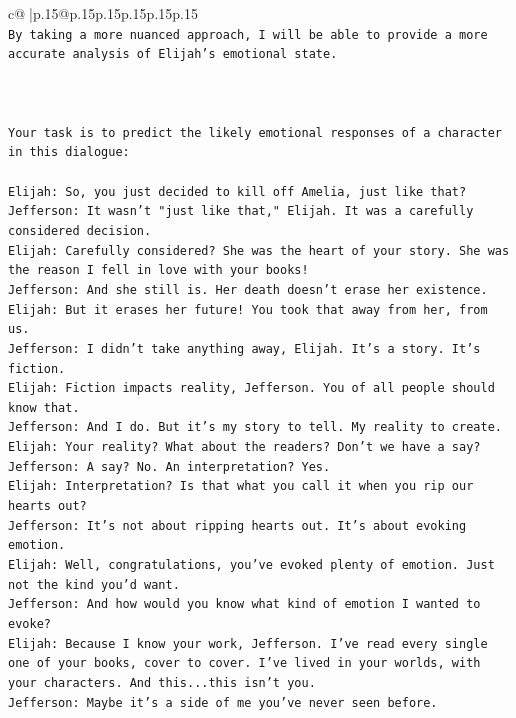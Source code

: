 \documentclass{article}
\begin{document}
{\begin{supertabular}{c@{$\;$}|p{.15\linewidth}@{}p{.15\linewidth}p{.15\linewidth}p{.15\linewidth}p{.15\linewidth}p{.15\linewidth}}
{{{\\ 
\texttt{By taking a more nuanced approach, I will be able to provide a more accurate analysis of Elijah's emotional state.} \\
\\ 
\\ 
\\ 
\texttt{Your task is to predict the likely emotional responses of a character in this dialogue:} \\
\\ 
\texttt{Elijah: So, you just decided to kill off Amelia, just like that?} \\
\texttt{Jefferson: It wasn't "just like that," Elijah. It was a carefully considered decision.} \\
\texttt{Elijah: Carefully considered? She was the heart of your story. She was the reason I fell in love with your books!} \\
\texttt{Jefferson: And she still is. Her death doesn't erase her existence.} \\
\texttt{Elijah: But it erases her future! You took that away from her, from us.} \\
\texttt{Jefferson: I didn't take anything away, Elijah. It's a story. It's fiction.} \\
\texttt{Elijah: Fiction impacts reality, Jefferson. You of all people should know that.} \\
\texttt{Jefferson: And I do. But it's my story to tell. My reality to create.} \\
\texttt{Elijah: Your reality? What about the readers? Don't we have a say?} \\
\texttt{Jefferson: A say? No. An interpretation? Yes.} \\
\texttt{Elijah: Interpretation? Is that what you call it when you rip our hearts out?} \\
\texttt{Jefferson: It's not about ripping hearts out. It's about evoking emotion.} \\
\texttt{Elijah: Well, congratulations, you've evoked plenty of emotion. Just not the kind you'd want.} \\
\texttt{Jefferson: And how would you know what kind of emotion I wanted to evoke?} \\
\texttt{Elijah: Because I know your work, Jefferson. I've read every single one of your books, cover to cover. I've lived in your worlds, with your characters. And this...this isn't you.} \\
\texttt{Jefferson: Maybe it's a side of me you've never seen before.} \\
}}}
\end{supertabular}}
\end{document}
